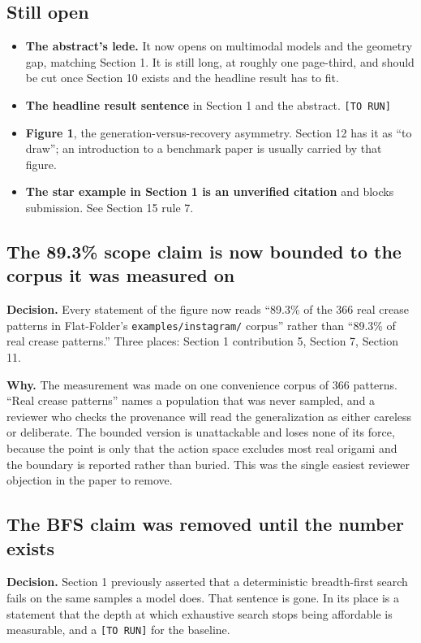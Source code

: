 \subsection{Still open}

\begin{itemize}
\item \textbf{The abstract's lede.} It now opens on multimodal models and the geometry gap,
  matching Section 1. It is still long, at roughly one page-third, and should be cut once
  Section 10 exists and the headline result has to fit.
\item \textbf{The headline result sentence} in Section 1 and the abstract. \texttt{[TO RUN]}
\item \textbf{Figure 1}, the generation-versus-recovery asymmetry. Section 12 has it as ``to
  draw''; an introduction to a benchmark paper is usually carried by that figure.
\item \textbf{The star example in Section 1 is an unverified citation} and blocks submission. See
  Section 15 rule 7.
\end{itemize}

\subsection{The 89.3\% scope claim is now bounded to the corpus it was measured on}

\textbf{Decision.} Every statement of the figure now reads ``89.3\% of the 366 real crease patterns
in Flat-Folder's \texttt{examples/instagram/} corpus'' rather than ``89.3\% of real crease
patterns.'' Three places: Section 1 contribution 5, Section 7, Section 11.

\textbf{Why.} The measurement was made on one convenience corpus of 366 patterns. ``Real crease
patterns'' names a population that was never sampled, and a reviewer who checks the provenance will
read the generalization as either careless or deliberate. The bounded version is unattackable and
loses none of its force, because the point is only that the action space excludes most real origami
and the boundary is reported rather than buried. This was the single easiest reviewer objection in
the paper to remove.

\subsection{The BFS claim was removed until the number exists}

\textbf{Decision.} Section 1 previously asserted that a deterministic breadth-first search fails on
the same samples a model does. That sentence is gone. In its place is a statement that the depth at
which exhaustive search stops being affordable is measurable, and a \texttt{[TO RUN]} for the
baseline.

